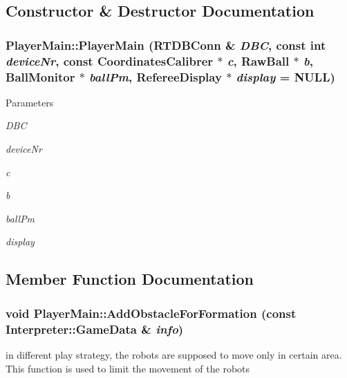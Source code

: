 \subsection{Constructor \& Destructor Documentation}
\hypertarget{classPlayerMain_a12957aeecc6902370f03ff2ffbb0551d}{
\subsubsection[{PlayerMain}]{\setlength{\rightskip}{0pt plus 5cm}PlayerMain::PlayerMain (RTDBConn \& {\em DBC}, \/  const int {\em deviceNr}, \/  const {\bf CoordinatesCalibrer} $\ast$ {\em c}, \/  RawBall $\ast$ {\em b}, \/  {\bf BallMonitor} $\ast$ {\em ballPm}, \/  {\bf RefereeDisplay} $\ast$ {\em display} = {\ttfamily NULL})}}
\label{classPlayerMain_a12957aeecc6902370f03ff2ffbb0551d}

\begin{DoxyParams}{Parameters}
\item[{\em DBC}]\item[{\em deviceNr}]\item[{\em c}]\item[{\em b}]\item[{\em ballPm}]\item[{\em display}]\end{DoxyParams}


\subsection{Member Function Documentation}
\hypertarget{classPlayerMain_a978b3ce16f5d8e5d1cb9ef70f387227e}{
\subsubsection[{AddObstacleForFormation}]{\setlength{\rightskip}{0pt plus 5cm}void PlayerMain::AddObstacleForFormation (const {\bf Interpreter::GameData} \& {\em info})}}
\label{classPlayerMain_a978b3ce16f5d8e5d1cb9ef70f387227e}


in different play strategy, the robots are supposed to move only in certain area. This function is used to limit the movement of the robots 


